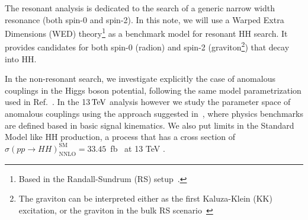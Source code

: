The resonant analysis is dedicated to the search of a generic narrow width resonance (both spin-0 and spin-2).
In this note, we will use a Warped Extra Dimensions (WED) theory\footnote{Based in the Randall-Sundrum (RS) setup~\cite{Randall:1999ee}. } as a benchmark model for resonant HH search. It provides candidates for both spin-0 (radion) and spin-2 (graviton\footnote{The graviton can be interpreted either as the first Kaluza-Klein (KK) excitation, or the graviton in the bulk RS scenario~\cite{Davoudiasl:2000wi,Csaki:2000zn, Agashe:2007zd} }) that decay into HH. 


In the non-resonant search, we investigate explicitly the case of anomalous couplings in the Higgs boson potential, 
following the same model parametrization used in Ref.~\cite{HIG-13-032}. 
In the 13$\,\text{Te\hspace{-.08em}V}$ analysis however we study the parameter space of anomalous couplings 
using the approach suggested in~\cite{Dall'Osso:2015aia}, where physics benchmarks are defined based in basic signal kinematics. 
We also put limits in the Standard Model like HH production, a process that has a cross section of $\sigma(pp\rightarrow HH)^{\text{SM}}_{\text{NNLO}} = 33.45$~fb~ at 13 TeV \cite{MelladoGarcia:2150771}.


